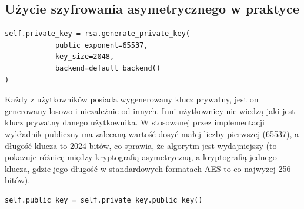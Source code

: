 \subsection{Użycie szyfrowania asymetrycznego w praktyce}
\begin{lstlisting}[caption={Generowanie klucza prywatnego}]
self.private_key = rsa.generate_private_key(
            public_exponent=65537,
            key_size=2048,
            backend=default_backend()
)
\end{lstlisting}

Każdy z użytkowników posiada wygenerowany klucz prywatny, jest on generowany losowo i niezależnie od innych. Inni użytkownicy nie wiedzą jaki jest klucz prywatny danego użytkownika. W stosowanej przez implementacji wykładnik publiczny ma zalecaną wartość dosyć małej liczby pierwszej (65537), a długość klucza to 2024 bitów, co sprawia, że algorytm jest wydajniejszy (to pokazuje różnicę między kryptografią asymetryczną, a kryptografią jednego klucza, gdzie jego długość w standardowych formatach AES to co najwyżej 256 bitów).


\begin{lstlisting}[caption={Generowanie klucza publicznego}]
self.public_key = self.private_key.public_key()
\end{lstlisting}

